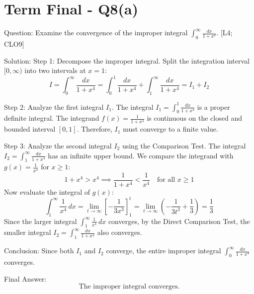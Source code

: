 \documentclass[11pt, a4paper]{article}
\begin{document}
\section*{Term Final - Q8(a)}

Question:
Examine the convergence of the improper integral $\int_{0}^{\infty} \frac{dx}{1+x^4}$. [L4; CLO9]

Solution:
Step 1: Decompose the improper integral.
Split the integration interval $[0, \infty)$ into two intervals at $x=1$:
\[
I = \int_{0}^{\infty} \frac{dx}{1+x^4} = \int_{0}^{1} \frac{dx}{1+x^4} + \int_{1}^{\infty} \frac{dx}{1+x^4} = I_1 + I_2
\]

Step 2: Analyze the first integral $I_1$.
The integral $I_1 = \int_{0}^{1} \frac{dx}{1+x^4}$ is a proper definite integral. The integrand $f(x) = \frac{1}{1+x^4}$ is continuous on the closed and bounded interval $[0, 1]$. Therefore, $I_1$ must converge to a finite value.

Step 3: Analyze the second integral $I_2$ using the Comparison Test.
The integral $I_2 = \int_{1}^{\infty} \frac{dx}{1+x^4}$ has an infinite upper bound.
We compare the integrand with $g(x) = \frac{1}{x^4}$ for $x \ge 1$:
\[
1 + x^4 > x^4 \implies \frac{1}{1+x^4} < \frac{1}{x^4} \quad \text{for all } x \ge 1
\]
Now evaluate the integral of $g(x)$:
\[
\int_{1}^{\infty} \frac{1}{x^4} \, dx = \lim_{t \to \infty} \left[ -\frac{1}{3x^3} \right]_{1}^{t} = \lim_{t \to \infty} \left( -\frac{1}{3t^3} + \frac{1}{3} \right) = \frac{1}{3}
\]
Since the larger integral $\int_{1}^{\infty} \frac{1}{x^4} \, dx$ converges, by the Direct Comparison Test, the smaller integral $I_2 = \int_{1}^{\infty} \frac{dx}{1+x^4}$ also converges.

Conclusion:
Since both $I_1$ and $I_2$ converge, the entire improper integral $\int_{0}^{\infty} \frac{dx}{1+x^4}$ converges.

Final Answer:
\[
\boxed{\text{The improper integral converges.}}
\]



\end{document}
